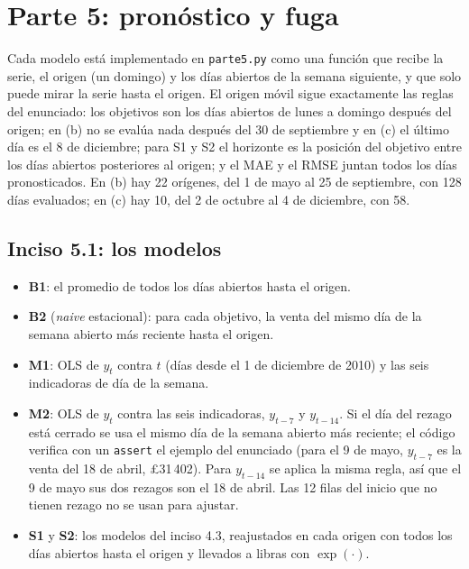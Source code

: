 \section{Parte 5: pronóstico y fuga}
\label{sec:parte5}

Cada modelo está implementado en \texttt{parte5.py} como una función que
recibe la serie, el origen (un domingo) y los días abiertos de la semana
siguiente, y que solo puede mirar la serie hasta el origen. El origen móvil
sigue exactamente las reglas del enunciado: los objetivos son los días
abiertos de lunes a domingo después del origen; en (b) no se evalúa nada
después del 30 de septiembre y en (c) el último día es el 8 de diciembre; para
S1 y S2 el horizonte es la posición del objetivo entre los días abiertos
posteriores al origen; y el MAE y el RMSE juntan todos los días pronosticados.
En (b) hay 22 orígenes, del 1 de mayo al 25 de septiembre, con 128 días
evaluados; en (c) hay 10, del 2 de octubre al 4 de diciembre, con 58.

\subsection{Inciso 5.1: los modelos}

\begin{itemize}
  \item \textbf{B1}: el promedio de todos los días abiertos hasta el origen.
  \item \textbf{B2} (\emph{naive} estacional): para cada objetivo, la venta del
    mismo día de la semana abierto más reciente hasta el origen.
  \item \textbf{M1}: OLS de $y_t$ contra $t$ (días desde el 1 de diciembre de
    2010) y las seis indicadoras de día de la semana.
  \item \textbf{M2}: OLS de $y_t$ contra las seis indicadoras, $y_{t-7}$ y
    $y_{t-14}$. Si el día del rezago está cerrado se usa el mismo día de la
    semana abierto más reciente; el código verifica con un \texttt{assert} el
    ejemplo del enunciado (para el 9 de mayo, $y_{t-7}$ es la venta del 18 de
    abril, \pounds31\,402). Para $y_{t-14}$ se aplica la misma regla, así que
    el 9 de mayo sus dos rezagos son el 18 de abril. Las 12 filas del inicio
    que no tienen rezago no se usan para ajustar.
  \item \textbf{S1} y \textbf{S2}: los modelos del inciso 4.3, reajustados en
    cada origen con todos los días abiertos hasta el origen y llevados a
    libras con $\exp(\cdot)$.
\end{itemize}

